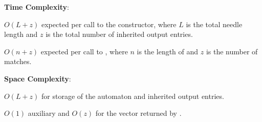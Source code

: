 \textbf{Time Complexity}:
\begin{compactitem}
  \item $O(L + z)$ expected per call to the constructor, where $L$ is the total needle length and $z$ is the total number of inherited output entries.
  \item $O(n + z)$ expected per call to , where $n$ is the length of  and $z$ is the number of matches.
\end{compactitem}

\textbf{Space Complexity}:
\begin{compactitem}
  \item $O(L + z)$ for storage of the automaton and inherited output entries.
  \item $O(1)$ auxiliary and $O(z)$ for the vector returned by .
\end{compactitem}


